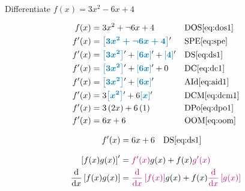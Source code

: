 \begin{example}[id:20141128-151834] \label{20141128-151834} \hfill \\

Differentiate $f(x)=3x^2-6x+4$

\soln

\solnsteps
\begin{align*}
f(x) &= 3x^2 + \neg 6x + 4 && \text{DOS} \eqref{eq:dos1} \\
f'(x) &= \farg{3x^2 + \neg 6x + 4}' && \text{SPE} \eqref{eq:spe} \\
f'(x) &= \farg{3x^2}' + \farg{6x}' + \farg{4}' && \text{DS} \eqref{eq:ds1} \\
f'(x) &= \farg{3x^2}' + \farg{6x}' + 0 && \text{DC} \eqref{eq:dc1} \\
f'(x) &= \farg{3x^2}' + \farg{6x}' && \text{AId} \eqref{eq:aid1} \\
f'(x) &= 3\farg{x^2}' + 6\farg{x}' && \text{DCM} \eqref{eq:dcm1} \\
f'(x) &= 3 \left(2x \right) + 6 \left(1\right) && \text{DPo} \eqref{eq:dpo1} \\
f'(x) &= 6x+6 && \text{OOM} \eqref{eq:oom} 
\end{align*}

\soln
\lesssteps
\begin{align*}
f'(x) & = 6x+6 && \text{DS} \eqref{eq:ds1}  
\end{align*}
\end{example}


\begin{arule}
\begin{align}
	\left[f(x)g(x) \right]' &= \cRed{f'(x)}g(x) + f(x)\cRed{g'(x)} \label{eq:dpr1} \\
	\dfrac{\dd}{\dx} \left[f(x)g(x) \right] &= \cRed{\dfrac{\dd}{\dx} \left[f(x) \right]}g(x) + f(x)\cRed{\dfrac{\dd}{\dx} \left[g(x)\right]}  \label{eq:dpr2}
\end{align}
\end{arule}

